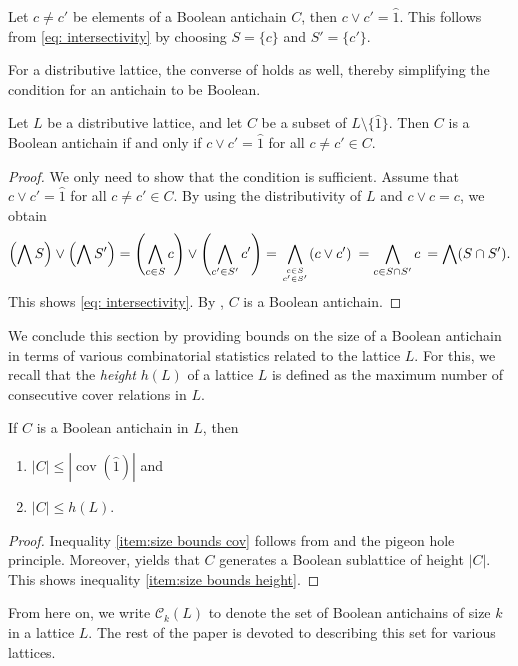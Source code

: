\documentclass{preprint}
\newcommand{\cov}{\operatorname{cov}}
\newcommand{\cC}{\mathcal{C}}
\theoremstyle{definition}
\begin{document}
\begin{remark}\label{lem:single elements join to top}
    Let $c\neq c'$ be elements of a Boolean antichain $C$, then $c\vee c' = \hat{1}$. This follows from \eqref{eq: intersectivity} by choosing $S=\{c\}$ and $S'=\{c'\}$. 
\end{remark}

For a distributive lattice, the converse of  holds as well, thereby simplifying the condition for an antichain to be Boolean.
\begin{lemma}\label{lem:distributive}
    Let $L$ be a distributive lattice, and let $C$ be a subset of $L\setminus\{\hat{1}\}$. Then $C$ is a Boolean antichain if and only if $c\vee c' = \hat{1}$ for all $c\neq c' \in C$.
\end{lemma}
\begin{proof}
    We only need to show that the condition is sufficient.
    Assume that $c\vee c'=\hat{1}$ for all $c\neq c'\in C$.
    By using the distributivity of $L$ and $c\vee c = c$, we obtain
    \[
        \left(\bigwedge S\right)\vee \left(\bigwedge S'\right) = \left( \bigwedge_{c \in S} c\right) \vee \left( \bigwedge_{c' \in S'} c' \right) = \bigwedge_{\genfrac{}{}{0pt}{}{c \in S}{c' \in S'}} ( c \vee c' ) \: = \bigwedge_{c\in S\cap S'}c \: =\bigwedge(S\cap S').
    \]
    This shows \eqref{eq: intersectivity}. By , $C$ is a Boolean antichain.
\end{proof}

We conclude this section by providing bounds on the size of a Boolean antichain in terms of various combinatorial statistics related to the lattice $L$. For this, we recall that the \textit{height} $h(L)$ of a lattice $L$ is defined as the maximum number of consecutive cover relations in $L$.

\begin{lemma}\label{lem:size bounds}
    If $C$ is a Boolean antichain in $L$, then 
    \begin{enumerate}
        \item\label{item:size bounds cov} $|C| \leq | \cov(\hat{1})|$ and
        \item\label{item:size bounds height} $|C| \leq h(L)$.
    \end{enumerate}
\end{lemma}
\begin{proof}
    Inequality \eqref{item:size bounds cov} follows from  and the pigeon hole principle.
    Moreover,  yields that $C$ generates a Boolean sublattice of height $|C|$. This shows inequality \eqref{item:size bounds height}.
\end{proof}
From here on, we write $\cC_k(L)$ to denote the set of Boolean antichains of size $k$ in a lattice $L$. The rest of the paper is devoted to describing this set for various lattices.
\end{document}
